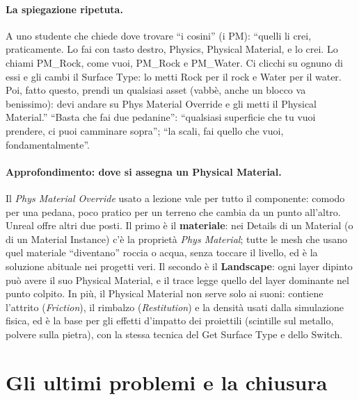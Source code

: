 \paragraph{La spiegazione ripetuta.} A uno studente che chiede dove trovare ``i cosini''
(i PM): ``quelli li crei, praticamente. Lo fai con tasto destro, Physics, Physical
Material, e lo crei. Lo chiami PM\_Rock, come vuoi, PM\_Rock e PM\_Water. Ci clicchi su
ognuno di essi e gli cambi il Surface Type: lo metti Rock per il rock e Water per il
water. Poi, fatto questo, prendi un qualsiasi asset (vabbè, anche un blocco va
benissimo): devi andare su Phys Material Override e gli metti il Physical Material.''
``Basta che fai due pedanine'': ``qualsiasi superficie che tu vuoi prendere, ci puoi
camminare sopra''; ``la scali, fai quello che vuoi, fondamentalmente''.

\paragraph{Approfondimento: dove si assegna un Physical Material.} Il \emph{Phys Material
Override} usato a lezione vale per tutto il componente: comodo per una pedana, poco
pratico per un terreno che cambia da un punto all'altro. Unreal offre altri due posti. Il
primo è il \textbf{materiale}: nei Details di un Material (o di un Material Instance) c'è
la proprietà \emph{Phys Material}; tutte le mesh che usano quel materiale ``diventano''
roccia o acqua, senza toccare il livello, ed è la soluzione abituale nei progetti veri.
Il secondo è il \textbf{Landscape}: ogni layer dipinto può avere il suo Physical Material,
e il trace legge quello del layer dominante nel punto colpito. In più, il Physical
Material non serve solo ai suoni: contiene l'attrito (\emph{Friction}), il rimbalzo
(\emph{Restitution}) e la densità usati dalla simulazione fisica, ed è la base per gli
effetti d'impatto dei proiettili (scintille sul metallo, polvere sulla pietra), con la
stessa tecnica del Get Surface Type e dello Switch.

\section{Gli ultimi problemi e la chiusura}
\label{ue10:sec:chiusura}

